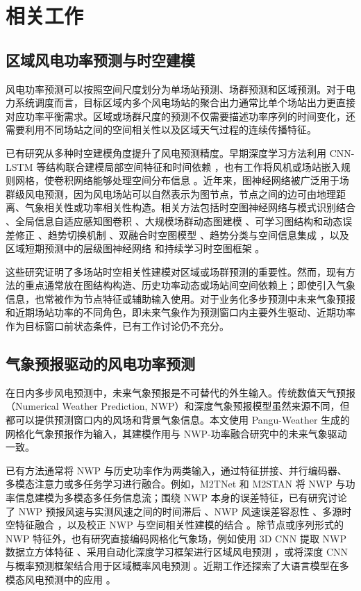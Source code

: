 \section{相关工作}

\subsection{区域风电功率预测与时空建模}

风电功率预测可以按照空间尺度划分为单场站预测、场群预测和区域预测。对于电力系统调度而言，目标区域内多个风电场站的聚合出力通常比单个场站出力更直接对应功率平衡需求。区域或场群尺度的预测不仅需要描述功率序列的时间变化，还需要利用不同场站之间的空间相关性以及区域天气过程的连续传播特征。

已有研究从多种时空建模角度提升了风电预测精度。早期深度学习方法利用 CNN-LSTM 等结构联合建模局部空间特征和时间依赖 \cite{ref3}，也有工作将风机或场站嵌入规则网格，使卷积网络能够处理空间分布信息 \cite{ref4}。近年来，图神经网络被广泛用于场群级风电预测，因为风电场站可以自然表示为图节点，节点之间的边可由地理距离、气象相关性或功率相关性构造。相关方法包括时空图神经网络与模式识别结合 \cite{ref5}、全局信息自适应感知图卷积 \cite{ref6}、大规模场群动态图建模 \cite{ref7}、可学习图结构和动态误差修正 \cite{ref8}、趋势切换机制 \cite{ref9}、双融合时空图模型 \cite{ref10}、趋势分类与空间信息集成 \cite{ref11}，以及区域短期预测中的层级图神经网络 \cite{ref2} 和持续学习时空图框架 \cite{ref12}。

这些研究证明了多场站时空相关性建模对区域或场群预测的重要性。然而，现有方法的重点通常放在图结构构造、历史功率动态或场站间空间依赖上；即使引入气象信息，也常被作为节点特征或辅助输入使用。对于业务化多步预测中未来气象预报和近期场站功率的不同角色，即未来气象作为预测窗口内主要外生驱动、近期功率作为目标窗口前状态条件，已有工作讨论仍不充分。

\subsection{气象预报驱动的风电功率预测}

在日内多步风电预测中，未来气象预报是不可替代的外生输入。传统数值天气预报（Numerical Weather Prediction, NWP）和深度气象预报模型虽然来源不同，但都可以提供预测窗口内的风场和背景气象信息。本文使用 Pangu-Weather \cite{ref22} 生成的网格化气象预报作为输入，其建模作用与 NWP-功率融合研究中的未来气象驱动一致。

已有方法通常将 NWP 与历史功率作为两类输入，通过特征拼接、并行编码器、多模态注意力或多任务学习进行融合。例如，M2TNet \cite{ref13} 和 M2STAN \cite{ref14} 将 NWP 与功率信息建模为多模态多任务信息流；围绕 NWP 本身的误差特征，已有研究讨论了 NWP 预报风速与实测风速之间的时间滞后 \cite{ref15}、NWP 风速误差容忍性 \cite{ref16}、多源时空特征融合 \cite{ref17}，以及校正 NWP 与空间相关性建模的结合 \cite{ref18}。除节点或序列形式的 NWP 特征外，也有研究直接编码网格化气象场，例如使用 3D CNN 提取 NWP 数据立方体特征 \cite{ref19}、采用自动化深度学习框架进行区域风电预测 \cite{ref20}，或将深度 CNN 与概率预测框架结合用于区域概率风电预测 \cite{ref21}。近期工作还探索了大语言模型在多模态风电预测中的应用 \cite{ref23}。

